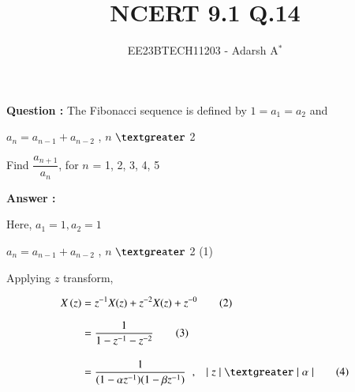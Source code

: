 \documentclass[journal,12pt,twocolumn]{IEEEtran}
\theoremstyle{remark}
\begin{document}
	
	
	\vspace{3cm}
	
	\title{NCERT 9.1 Q.14}
	\author{EE23BTECH11203 - Adarsh A$^{*}$%
	}
	\maketitle
	\bigskip
	
	\renewcommand{\thefigure}{\theenumi}
	\renewcommand{\thetable}{\theenumi}
	
	
	\vspace{0.2cm}
	\linespread{1.1}
	
	
	\textbf{\fontsize{13.5}{20}\selectfont Question : }
	\fontsize{13.5}{20}\selectfont The Fibonacci sequence is defined by $1 = a_1 = a_2$ and \par $a_n = a_{n-1} + a_{n-2}$ , $n$ $\textgreater$ 2
	
	\vspace{0.2cm}
	Find $\dfrac{a_{n + 1}}{a_n}$, for $n$ = 1, 2, 3, 4, 5
	
	\vspace{0.3cm}
	\textbf{\fontsize{13.5}{20}\selectfont Answer : }
	\vspace{0.3cm}
	\fontsize{13.5}{20}\selectfont 
	
	
	
	\vspace{-0.2cm}
	
	\fontsize{13.5}{20}\selectfont
	Here, $a_1 = 1, a_2 = 1$
	
	$a_n = a_{n-1} + a_{n-2}$ , $n$ $\textgreater$ 2 \hfill (1)
	
	\vspace{0.2cm}
	
	
	
	
	
	Applying $z$ transform,
	
	\vspace{-0.8cm}
	
	\begin{align}
		X\brak z	&= z^{-1} X(z) + z^{-2} X(z) + z^{-0} \tag{2} \\[6pt]
		&= \dfrac{1}{1 - z^{-1} - z^{-2}} \tag{3} \\[10pt]
		&= \dfrac{1}{(1 - \alpha z^{-1})(1 - \beta z^{-1})} \hspace{0.2cm}, \hspace{0.3cm}\lvert \hspace{0.1cm} z \hspace{0.1cm}\rvert \hspace{0.1cm} \textgreater \hspace{0.1cm} \lvert \hspace{0.1cm} \alpha \hspace{0.1cm} \rvert  \tag{4}				
	\end{align}
	
\end{document}
